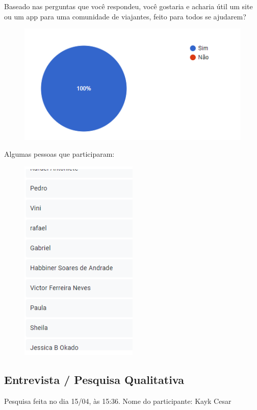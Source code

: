 \documentclass{article}
\begin{document}
Baseado nas perguntas que você respondeu, você gostaria e acharia útil um site ou um app para uma comunidade de viajantes, feito para todos se ajudarem?
\begin{figure}[H]
      \centering
      \includegraphics [width=1\textwidth]{IMGDOC/Fim pesquisa.png}
      \label{Pesquisa6}
\end{figure}

Algumas pessoas que participaram:
\begin{figure}[H]
      \centering
      \includegraphics [width=0.5\textwidth]{IMGDOC/participantes.png}
      \label{Pesquisa7}
\end{figure}


{\subsection{Entrevista / Pesquisa Qualitativa}}
Pesquisa feita no dia 15/04, às 15:36. Nome do participante: Kayk Cesar
\end{document}
